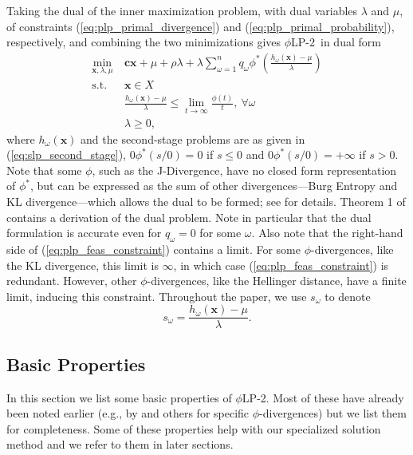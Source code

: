 \documentclass[opre,nonblindrev]{informs3} %
\newcommand{\x}{\mathbf{x}}
\renewcommand{\c}{\mathbf{c}}
\newcommand{\st}{\mbox{s.t.}}
\newcommand{\plp}{$\phi$LP-2}
\begin{document}
Taking the dual of the inner maximization problem, with dual variables $\lambda$ and $\mu$, of constraints (\ref{eq:plp_primal_divergence}) and (\ref{eq:plp_primal_probability}), respectively, and combining the two minimizations gives \plp\ in dual form
\begin{align}
	\min_{\x,\lambda,\mu} \ & \c\x + \mu + \rho \lambda + \lambda \sum_{\omega=1}^{n} q_\omega \phi^*\left(\frac{h_\omega(\x) - \mu}{\lambda}\right) \label{eq:plp_two_stage} \\
	\st \ & \x \in X \nonumber \\
	& \frac{h_\omega(\x) - \mu}{\lambda} \leq \lim_{t \rightarrow \infty} \frac{\phi(t)}{t}, \ \forall \omega \label{eq:plp_feas_constraint}\\
	& \lambda \geq 0, \nonumber
\end{align}
where $h_\omega(\x)$ and the second-stage problems are as given in (\ref{eq:slp_second_stage}), $0\phi^*(s/0)=0$ if $s\leq 0$ and  $0\phi^*(s/0)=+\infty$ if $s > 0$.
Note that some $\phi$, such as the J-Divergence, have no closed form representation of $\phi^*$, but can be expressed as the sum of other divergences---Burg Entropy and KL divergence---which allows the dual to be formed; see \citep{bental2011robust} for details.
Theorem 1 of \cite{bental2011robust} contains a derivation of the dual problem.
Note in particular that the dual formulation is accurate even for $q_\omega = 0$ for some $\omega$.
Also note that the right-hand side of (\ref{eq:plp_feas_constraint}) contains a limit.
For some $\phi$-divergences, like the KL divergence, this limit is $\infty$, in which case (\ref{eq:plp_feas_constraint}) is redundant.
However, other $\phi$-divergences, like the Hellinger distance, have a finite limit, inducing this constraint.
Throughout the paper, we use $s_\omega$ to denote
\begin{equation}
	s_\omega = \frac{h_\omega(\x) - \mu}{\lambda}. \label{eq:s_omega_definition}
\end{equation}


\subsection{Basic Properties}
\label{ssec:basicprop}

In this section we list some basic properties of \plp.
Most of these have already been noted earlier (e.g., by \cite{bental2011robust} and others for specific $\phi$-divergences) but we list them for completeness.
Some of these properties help with our specialized solution method and we refer to them in later sections.
\end{document}
